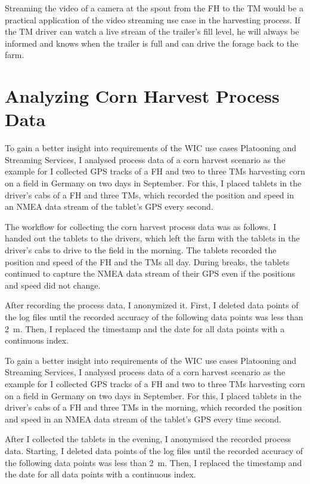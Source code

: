 Streaming the video of a camera at the spout from the \ac{FH} to the \ac{TM} would be a practical application of the video streaming use case in the harvesting process. If the \ac{TM} driver can watch a live stream of the trailer's fill level, he will always be
informed and knows when the trailer is full and can drive the forage back to the
farm.

\chapter{Analyzing Corn Harvest Process Data}

To gain a better insight into requirements of the \ac{WIC} use cases Platooning and Streaming Services, I analysed process data of a corn harvest scenario as the example for I collected GPS tracks of a \ac{FH} and two to three \ac{TM}s harvesting corn on a field in Germany on two days in September. For this, I placed tablets in the driver's cabs of a \ac{FH} and three \ac{TM}s, which recorded the position and speed in an NMEA data stream of the tablet's GPS every second. 

The workflow for collecting the corn harvest process data was as follows. 
I handed out the tablets to the drivers, which left the farm with the tablets in the driver's cabs to drive to the field in the morning. The tablets recorded the position and speed of the \ac{FH} and the \ac{TM}s all day. During breaks, the tablets continued to capture the NMEA data stream of their GPS even if the positions and speed did not change.

After recording the process data, I anonymized it. 
First, I deleted data points of the log files until the recorded accuracy of the following data points was less than \SI{2}{\metre}. Then, I replaced the timestamp and the date for all data points with a continuous index.

To gain a better insight into requirements of the \ac{WIC} use cases Platooning and Streaming Services, I analysed process data of a corn harvest scenario as the example for I collected GPS tracks of a \ac{FH} and two to three \ac{TM}s harvesting corn on a field in Germany on two days in September. For this, I placed tablets in the driver's cabs of a \ac{FH} and three \ac{TM}s in the morning, which recorded the position and speed in an NMEA data stream of the tablet's GPS every time second. 

After I collected the tablets in the evening, I anonymised the recorded process data. 
Starting, I deleted data points of the log files until the recorded accuracy of the following data points was less than \SI{2}{\metre}. Then, I replaced the timestamp and the date for all data points with a continuous index.

